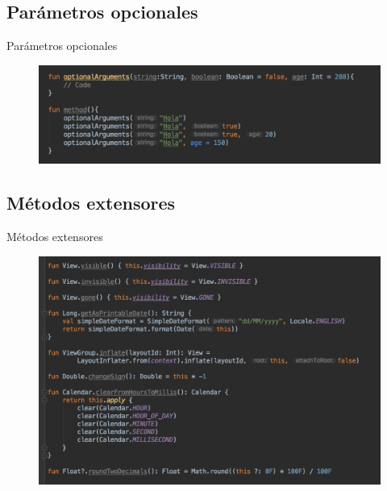 \subsection{Parámetros opcionales}

\begin{frame}{Parámetros opcionales}{}
    \begin{figure}[h]
    \centering
    \includegraphics[width=\textwidth]{images/kotlin_vs_java/optional_arguments}
    \end{figure}
\end{frame}


\subsection{Métodos extensores}
\begin{frame}{Métodos extensores}{}
    \begin{figure}[h]
    \centering
    \includegraphics[width=\textwidth]{images/kotlin_vs_java/extension_methods}
    \end{figure}
\end{frame}

